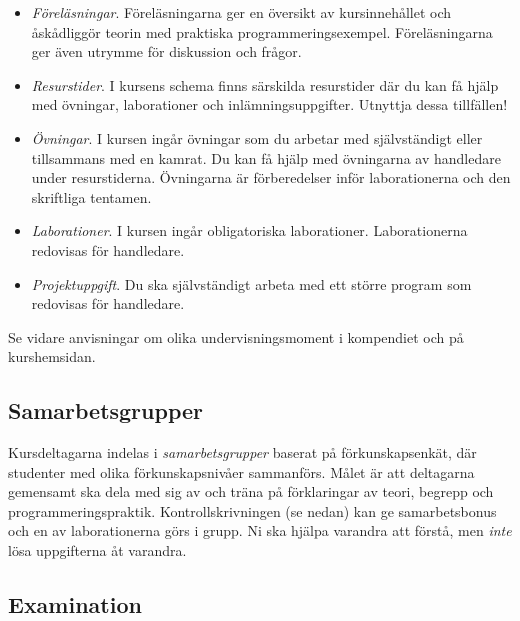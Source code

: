 \documentclass[a4paper,12pt,oneside]{memoir}
\begin{document}
\begin{itemize}
\item
  \emph{Föreläsningar}. Föreläsningarna ger en översikt av
  kursinnehållet och åskådliggör teorin med praktiska
  programmeringsexempel. Föreläsningarna ger även utrymme för diskussion
  och frågor.
\item
  \emph{Resurstider}. I kursens schema finns särskilda resurstider
  där du kan få hjälp med övningar, laborationer och
  inlämningsuppgifter. Utnyttja dessa tillfällen!
\item
  \emph{Övningar}. I kursen ingår övningar som du arbetar med
  självständigt eller tillsammans med en kamrat.
  Du kan få hjälp med övningarna av handledare under resurstiderna.
  Övningarna är förberedelser inför laborationerna och den skriftliga tentamen.
\item
  \emph{Laborationer}. I kursen ingår obligatoriska laborationer.
  Laborationerna redovisas för handledare.
\item
  \emph{Projektuppgift}. Du ska självständigt arbeta med ett större
  program som redovisas för handledare. %
\end{itemize}
Se vidare anvisningar om olika undervisningsmoment i kompendiet och på kurshemsidan.

\subsection{Samarbetsgrupper}\label{samarbetsgrupper}

Kursdeltagarna indelas i \emph{samarbetsgrupper} baserat
på förkunskapsenkät, där studenter med olika förkunskapsnivåer
sammanförs. Målet är att deltagarna gemensamt ska
dela med sig av och träna på förklaringar av teori, begrepp och
programmeringspraktik. Kontrollskrivningen (se
nedan) kan ge samarbetsbonus  och en av laborationerna görs i grupp. Ni ska hjälpa varandra att
förstå, men \emph{inte} lösa uppgifterna åt varandra.

\subsection{Examination}\label{examination}
\end{document}

